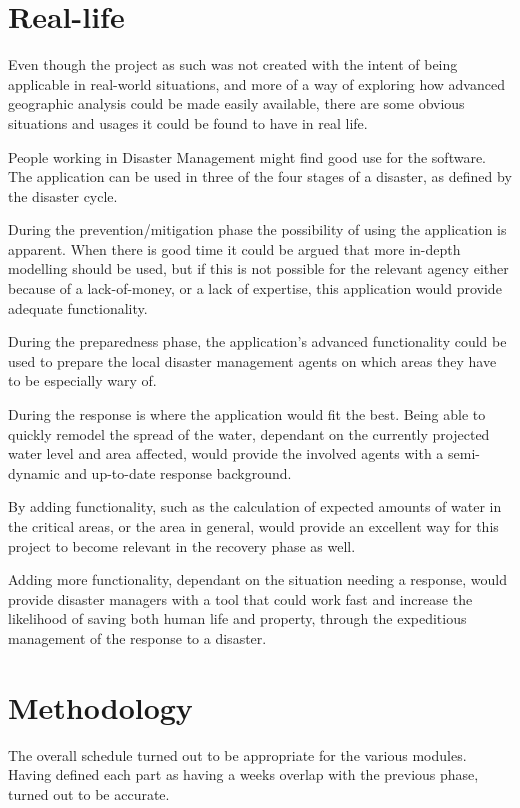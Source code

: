 \section{Real-life}
Even though the project as such was not created with the intent of being applicable in real-world situations, and more of a way of exploring how advanced geographic analysis could be made easily available, there are some obvious situations and usages it could be found to have in real life. 

People working in Disaster Management might find good use for the software. The application can be used in three of the four stages of a disaster, as defined by the disaster cycle. 

During the prevention/mitigation phase the possibility of using the application is apparent. When there is good time it could be argued that more in-depth modelling should be used, but if this is not possible for the relevant agency either because of a lack-of-money, or a lack of expertise, this application would provide adequate functionality.

During the preparedness phase, the application's advanced functionality could be used to prepare the local disaster management agents on which areas they have to be especially wary of.

During the response is where the application would fit the best. Being able to quickly remodel the spread of the water, dependant on the currently projected water level and area affected, would provide the involved agents with a semi-dynamic and up-to-date response background.

By adding functionality, such as the calculation of expected amounts of water in the critical areas, or the area in general, would provide an excellent way for this project to become relevant in the recovery phase as well. 

Adding more functionality, dependant on the situation needing a response, would provide disaster managers with a tool that could work fast and increase the likelihood of saving both human life and property, through the expeditious management of the response to a disaster.

\section{Methodology}
The overall schedule turned out to be appropriate for the various modules. Having defined each part as having a weeks overlap with the previous phase, turned out to be accurate.

